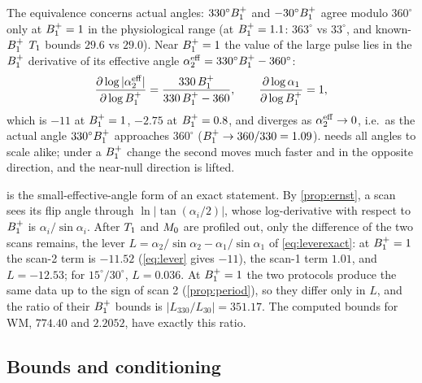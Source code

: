 The equivalence concerns actual angles: $330^\circ B_1^{+}$ and $-30^\circ B_1^{+}$ agree modulo $360^\circ$ only
at $B_1^{+}=1$ in the physiological range (at $B_1^{+}=1.1$: $363^\circ$ vs $33^\circ$, and known-$B_1^{+}$
$T_1$ bounds $29.6$ vs $29.0$). Near $B_1^{+}=1$ the value of the large pulse lies in the $B_1^{+}$
derivative of its effective angle $\alpha_2^{\rm eff}=330^\circ B_1^{+}-360^\circ$:
\begin{equation}
  \frac{\partial\log|\alpha_2^{\rm eff}|}{\partial\log B_1^{+}}=\frac{330\,B_1^{+}}{330\,B_1^{+}-360},
  \qquad\frac{\partial\log\alpha_1}{\partial\log B_1^{+}}=1,
  \label{eq:lever}
\end{equation}
which is $-11$ at $B_1^{+}=1$, $-2.75$ at $B_1^{+}=0.8$, and diverges as $\alpha_2^{\rm eff}\to0$, i.e.\ as the
actual angle $330^\circ B_1^{+}$ approaches $360^\circ$ ($B_1^{+}\to360/330=1.09$).
 needs all angles to scale alike; under a $B_1^{+}$ change the second moves much
faster and in the opposite direction, and the near-null direction is lifted.

 is the small-effective-angle form of an exact statement. By \cref{prop:ernst}, a
scan sees its flip angle through $\ln|\tan(\alpha_i/2)|$, whose log-derivative with respect to $B_1^{+}$ is
$\alpha_i/\sin\alpha_i$. After $T_1$ and $M_0$ are profiled out, only the difference of the two scans
remains, the lever $L=\alpha_2/\sin\alpha_2-\alpha_1/\sin\alpha_1$ of \eqref{eq:leverexact}: at $B_1^{+}=1$ the scan-2
term is $-11.52$ (\cref{eq:lever} gives $-11$), the scan-1 term $1.01$, and $L=-12.53$; for
$15^\circ/30^\circ$, $L=0.036$. At $B_1^{+}=1$ the two protocols produce the same data up to the sign of
scan 2 (\cref{prop:period}), so they differ only in $L$, and the ratio of their $B_1^{+}$ bounds is
$|L_{330}/L_{30}|=351.17$. The computed bounds for WM, $774.40$ and $2.2052$, have exactly this ratio.

\subsection{Bounds and conditioning}

